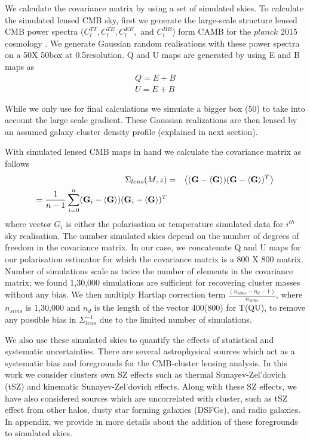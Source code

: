  We calculate the covariance matrix by using a set of simulated skies. 
 To calculate the simulated lensed CMB sky, first we generate the large-scale structure lensed CMB power spectra ($C^{TT}_{l}, C^{TE}_{l}, C^{EE}_{l},$ and $C^{BB}_{l}$) form CAMB for the $planck$ 2015 cosmology \citep{planck15_13}.  
 We generate Gaussian random realisations with these power spectra on a 50\am X 50\am box at 0.5\am resolution. 
 Q and U maps are generated by using E and B maps as
 \begin{eqnarray}
Q = E + B\\
U = E + B
 \label{eq:coord_trans}
 \end{eqnarray}
 
 While we only use  \smallboxsize  for final calculations we simulate a bigger box (50\am) to take into account the large scale gradient.
 These Gaussian realizations are then lensed by an assumed galaxy cluster density profile (explained in next section). 
 
 With simulated lensed CMB maps in hand we calculate the covariance matrix as follows
 \begin{eqnarray}
\Sigma_{lens}(M,z) & = & \left<(\textrm{\textbf{G}} - \left<\textrm{\textbf{G}}\right>) (\textrm{\textbf{G}} - \left<\textrm{\textbf{G}}\right>)^{T}\right>\\
  =   \frac{1}{n-1}\sum\limits_{i = 0}^{n} (\textrm{\textbf{G}}_{i} - \left<\textrm{\textbf{G}}\right>) (\textrm{\textbf{G}}_{i} - \left<\textrm{\textbf{G}}\right>)^{T} %
\label{eq_lensed_cmb_cov_mass_z}
\end{eqnarray}
 where vector $G_{i}$ is either the polarisation or temperature simulated data for $i^{th}$ sky realisation. 
 The number simulated skies depend on the number of degrees of freedom in the covariance matrix. 
 In our case, we concatenate Q and U maps for our polarisation estimator for which the covariance matrix is a 800 X 800 matrix. 
 Number of simulations scale as twice the number of elements in the covariance matrix; we found 1,30,000 simulations are sufficient for recovering cluster masses without any bias. 
  We then multiply Hartlap correction term $\frac{(n_{sims} -n_{d} -1)}{n_{sims}}$, where $n_{sims}$ is 1,30,000 and $n_{d}$ is the length of the vector 400(800) for T(QU), to remove any possible bias in $\Sigma^{-1}_{lens}$ due to the limited number of simulations. 
  
 We also use these simulated skies to quantify the effects of statistical and systematic uncertainties.
 There are several astrophysical sources which act as a systematic bias and foregrounds for the CMB-cluster lensing analysis. 
 In this work we consider clusters own SZ effects such as thermal Sunayev-Zel'dovich (tSZ) and kinematic Sunayev-Zel'dovich effects. 
 Along with these SZ effects, we have also considered sources which are uncorrelated with cluster, such as tSZ effect from other halos, dusty star forming galaxies (DSFGs), and radio galaxies.
 In appendix, we provide in more details about the addition of these foregrounds to simulated skies.
 
